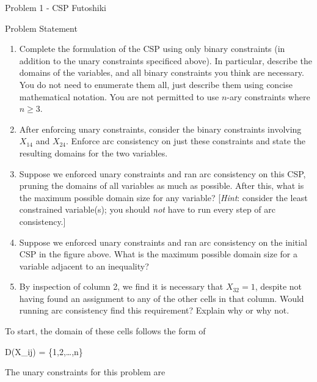 \begin{problem}{Problem 1 - CSP Futoshiki}
\begin{statement}{Problem Statement}
        \begin{enumerate}[label=\textbf{(\alph*)}]
            \item Complete the formulation of the CSP using only binary constraints (in addition to the unary constraints specificed above). In particular, describe the domains of the variables, and 
            all binary constraints you think are necessary. You do not need to enumerate them all, just describe them using concise mathematical notation. You are not permitted to use $n$-ary constraints 
            where $n \geq 3$.
            \item After enforcing unary constraints, consider the binary constraints involving $X_{14}$ and $X_{24}$. Enforce arc consistency on just these constraints and state the resulting domains 
            for the two variables.
            \item Suppose we enforced unary constraints and ran arc consistency on this CSP, pruning the domains of all variables as much as possible. After this, what is the maximum possible domain 
            size for any variable? [\textit{Hint}: consider the least constrained variable(s); you should \textit{not} have to run every step of arc consistency.]
            \item Suppose we enforced unary constraints and ran arc consistency on the initial CSP in the figure above. What is the maximum possible domain size for a variable adjacent to an inequality?
            \item By inspection of column 2, we find it is necessary that $X_{32} = 1$, despite not having found an assignment to any of the other cells in that column. Would running arc consistency 
            find this requirement? Explain why or why not.
        \end{enumerate}
    \end{statement}

    \clearpage

    \begin{highlight}
        To start, the domain of these cells follows the form of 

        \begin{center}
            \begin{highlightbox}
                D(X_{ij}) = \{1,2,\dots,n\} 
            \end{highlightbox}
        \end{center}
        The unary constraints for this problem are


\end{highlight}
\end{problem}

